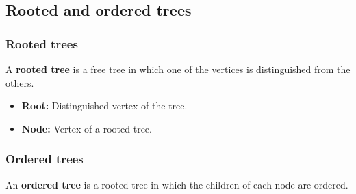 
\subsection{Rooted and ordered trees}
    \subsubsection{Rooted trees}
    \begin{definition}
        A \textbf{rooted tree} is a free tree in which one of the vertices is distinguished from the others.
        \begin{itemize}
            \item \textbf{Root:} Distinguished vertex of the tree.
            \item \textbf{Node:} Vertex of a rooted tree.
        \end{itemize}
    \end{definition}
    
    \subsubsection{Ordered trees}
    \begin{definition}
        An \textbf{ordered tree} is a rooted tree in which the children of each node are ordered.
    \end{definition}


